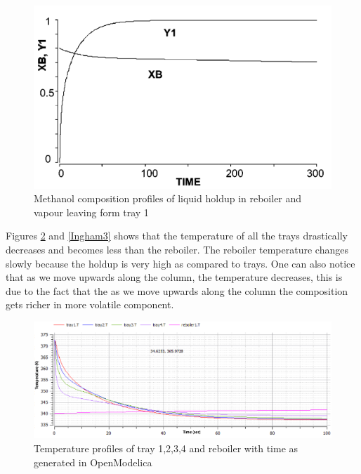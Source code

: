 \documentclass[12pt]{report}
\begin{document}
\begin{figure}
\centering
\includegraphics[width=1\linewidth]{Ingham2}
\caption{Methanol composition profiles of liquid holdup in reboiler and vapour leaving form tray 1 \cite{ingham}}
\label{Ingham2}
\end{figure}

Figures \ref{Ingham5} and \ref{Ingham3} shows that the temperature of all the trays drastically decreases and becomes less than the reboiler. The reboiler temperature changes slowly because the holdup is very high as compared to trays. One can also notice that as we move upwards along the column, the temperature decreases, this is due to the fact that the as we move upwards along the column the composition gets richer in more volatile component.

\begin{figure}
\centering
\includegraphics[width=1\linewidth]{Ingham5}
\caption{Temperature profiles of tray 1,2,3,4 and reboiler with time as generated in OpenModelica}
\label{Ingham5}
\end{figure}
\end{document}
